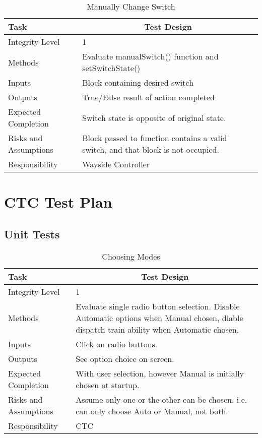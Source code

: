 \documentclass[]{article}
\begin{document}
	\begin{table}[H]
		\centering
		\caption{Manually Change Switch}
		\begin{tabular}{|l|l|}
			\hline
			Task & \multicolumn{1}{c|}{Test Design} \\ \hline
			Integrity Level & 1 \\ \hline
			Methods & Evaluate manualSwitch() function and setSwitchState()\\ \hline
			Inputs &  Block containing desired switch\\ \hline
			Outputs &  True/False result of action completed\\ \hline
			Expected Completion & Switch state is opposite of original state. \\ \hline
			Risks and Assumptions & \parbox[t]{10cm}{Block passed to function contains a valid switch, and that block is not occupied.} \\ \hline
			Responsibility & Wayside Controller\\ \hline
		\end{tabular}
	\end{table}

\section{CTC Test Plan}
\subsection{Unit Tests}
\begin{table}[H]
	\centering
	\caption{Choosing Modes}
	\begin{tabular}{|l|l|}
		\hline
		Task & \multicolumn{1}{c|}{Test Design} \\ \hline
		Integrity Level & 1 \\ \hline
		Methods & \parbox[t]{10cm}{Evaluate single radio button selection. Disable Automatic options when Manual chosen, diable dispatch train ability when Automatic chosen.}\\ \hline
		Inputs &  Click on radio buttons. \\ \hline
		Outputs &  See option choice on screen.\\ \hline
		Expected Completion & \parbox[t]{10cm}{With user selection, however Manual is initially chosen at startup.}\\ \hline
		Risks and Assumptions & \parbox[t]{10cm}{Assume only one or the other can be chosen. i.e. can only choose Auto or Manual, not both.} \\ \hline
		Responsibility & CTC\\ \hline
	\end{tabular}
\end{table}
\end{document}
